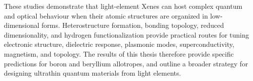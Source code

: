 These studies demonstrate that light-element Xenes can host complex quantum and optical behaviour when their atomic structures are organized in low-dimensional forms.
Heterostructure formation, bonding topology, reduced dimensionality,
and hydrogen functionalization provide practical routes for tuning electronic structure, dielectric response, plasmonic modes, superconductivity, magnetism, and topology.
The results of this thesis therefore provide specific predictions for boron and beryllium allotropes,
and outline a broader strategy for designing ultrathin quantum materials from light elements.
